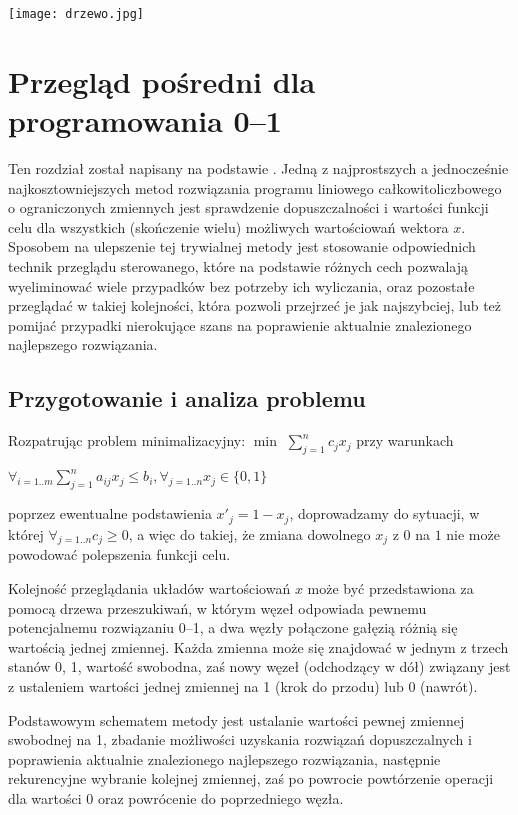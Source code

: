 \documentclass[licencjacka]{pracamgr}
\begin{document}
%
 \texttt{[image: drzewo.jpg]}\newline
   \section{Przegląd pośredni dla programowania 0--1}
Ten rozdział został napisany na podstawie \cite{SDK}.\newline
Jedną z najprostszych a jednocześnie najkosztowniejszych metod rozwiązania programu liniowego całkowitoliczbowego o ograniczonych zmiennych jest
sprawdzenie dopuszczalności i wartości funkcji celu dla wszystkich (skończenie wielu) możliwych wartościowań wektora $x$.
Sposobem na ulepszenie tej trywialnej metody jest stosowanie odpowiednich technik przeglądu sterowanego, które na podstawie różnych cech pozwalają
wyeliminować wiele przypadków bez potrzeby ich wyliczania, oraz pozostałe przeglądać w takiej kolejności, która pozwoli przejrzeć je jak najszybciej,
lub też pomijać przypadki nierokujące szans na poprawienie aktualnie znalezionego najlepszego rozwiązania.\newline
%
    \subsection{Przygotowanie i analiza problemu}
Rozpatrując problem minimalizacyjny:\newline
$\min$ $\sum\limits_{j=1}^{n}c_jx_j$ przy warunkach\newline
\centerline{$\forall_{i=1..m}\sum\limits_{j=1}^{n}a_{ij}x_j\le b_i,\forall_{j=1..n}x_j\in\{0,1\}$}\newline
poprzez ewentualne podstawienia $x'_j=1-x_j$, doprowadzamy do sytuacji, w której $\forall_{j=1..n}c_j\ge0$, a więc do takiej, że zmiana dowolnego $x_j$ z $0$ na $1$ nie może powodować
polepszenia funkcji celu.

Kolejność przeglądania układów wartościowań $x$ może być przedstawiona za pomocą drzewa przeszukiwań, w którym węzeł odpowiada pewnemu potencjalnemu rozwiązaniu 0--1,
a dwa węzły połączone gałęzią różnią się wartością jednej zmiennej. Każda zmienna może się znajdować w jednym z trzech stanów 0, 1, wartość swobodna, zaś nowy węzeł (odchodzący w dół)
związany jest z ustaleniem wartości jednej zmiennej na 1 (krok do przodu) lub 0 (nawrót).

Podstawowym schematem metody jest ustalanie wartości pewnej zmiennej swobodnej na 1, zbadanie możliwości uzyskania rozwiązań dopuszczalnych i poprawienia aktualnie znalezionego
najlepszego rozwiązania, następnie rekurencyjne wybranie kolejnej zmiennej, zaś po powrocie powtórzenie operacji dla wartości 0 oraz powrócenie do poprzedniego węzła.
\end{document}
